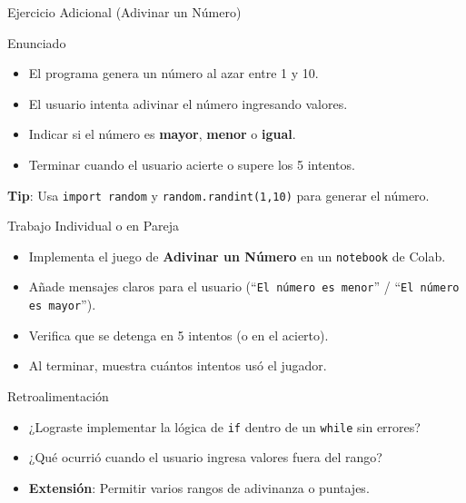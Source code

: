 \documentclass[10pt]{beamer}
\begin{document}
\begin{frame}{Ejercicio Adicional (Adivinar un Número)}
  \begin{block}{Enunciado}
    \begin{itemize}
      \item El programa genera un número al azar entre 1 y 10.
      \item El usuario intenta adivinar el número ingresando valores.
      \item Indicar si el número es \textbf{mayor}, \textbf{menor} o \textbf{igual}.
      \item Terminar cuando el usuario acierte o supere los 5 intentos.
    \end{itemize}
  \end{block}
  \textbf{Tip}: Usa \texttt{import random} y \texttt{random.randint(1,10)} para generar el número.
\end{frame}

\begin{frame}{Trabajo Individual o en Pareja}
  \begin{itemize}
    \item Implementa el juego de \textbf{Adivinar un Número} en un \texttt{notebook} de Colab.
    \item Añade mensajes claros para el usuario (“\texttt{El número es menor}” / “\texttt{El número es mayor}”).
    \item Verifica que se detenga en 5 intentos (o en el acierto).
    \item Al terminar, muestra cuántos intentos usó el jugador.
  \end{itemize}
\end{frame}

\begin{frame}{Retroalimentación}
  \begin{itemize}
    \item ¿Lograste implementar la lógica de \texttt{if} dentro de un \texttt{while} sin errores?
    \item ¿Qué ocurrió cuando el usuario ingresa valores fuera del rango?
    \item \textbf{Extensión}: Permitir varios rangos de adivinanza o puntajes.
  \end{itemize}
\end{frame}
\end{document}
